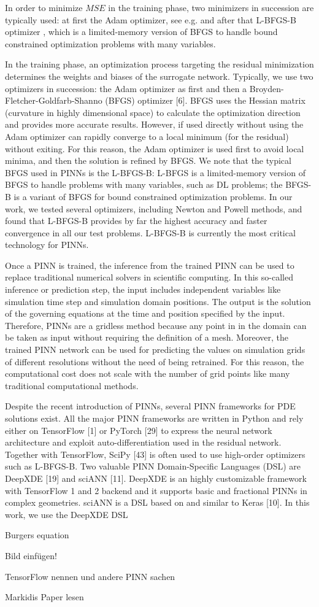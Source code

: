 In order to minimize $MSE$ in the training phase, two minimizers in succession are typically used: at first the Adam optimizer, see e.g. \cite{KingmaBa:2017} and after that L-BFGS-B optimizer \cite{ByrdLuNocedalZhu:1995}, which is a limited-memory version of BFGS to handle bound constrained optimization problems with many variables.







In the training phase, an optimization process targeting the residual minimization determines the weights and
biases of the surrogate network. Typically, we use two optimizers in succession: the Adam optimizer as first and
then a Broyden-Fletcher-Goldfarb-Shanno (BFGS) optimizer [6]. BFGS uses the Hessian matrix (curvature in highly
dimensional space) to calculate the optimization direction and provides more accurate results. However, if used directly
without using the Adam optimizer can rapidly converge to a local minimum (for the residual) without exiting. For this
reason, the Adam optimizer is used first to avoid local minima, and then the solution is refined by BFGS. We note that
the typical BFGS used in PINNs is the L-BFGS-B: L-BFGS is a limited-memory version of BFGS to handle problems with
many variables, such as DL problems; the BFGS-B is a variant of BFGS for bound constrained optimization problems. In
our work, we tested several optimizers, including Newton and Powell methods, and found that L-BFGS-B provides by
far the highest accuracy and faster convergence in all our test problems. L-BFGS-B is currently the most critical
technology for PINNs.


Once a PINN is trained, the inference from the trained PINN can be used to replace traditional numerical solvers in scientific computing. In this so-called inference or prediction step, the input includes independent variables like simulation time step and simulation domain positions. The output is the solution of the governing equations at the time and position specified by the input. Therefore, PINNs are a gridless method because any point in in the domain can be taken as input without requiring the definition of a mesh. Moreover, the trained PINN network can be used for predicting the values on simulation grids of different resolutions without the need of being retrained. For this reason, the computational cost does not scale with the number of grid points like many traditional computational methods.


Despite the recent introduction of PINNs, several PINN frameworks for PDE solutions exist. All the major PINN
frameworks are written in Python and rely either on TensorFlow [1] or PyTorch [29] to express the neural network
architecture and exploit auto-differentiation used in the residual network. Together with TensorFlow, SciPy [43] is
often used to use high-order optimizers such as L-BFGS-B. Two valuable PINN Domain-Specific Languages (DSL) are
DeepXDE [19] and sciANN [11]. DeepXDE is an highly customizable framework with TensorFlow 1 and 2 backend and it
supports basic and fractional PINNs in complex geometries. sciANN is a DSL based on and similar to Keras [10]. In this
work, we use the DeepXDE DSL



Burgers equation

Bild einfügen!

TensorFlow nennen und andere PINN sachen

Markidis Paper lesen